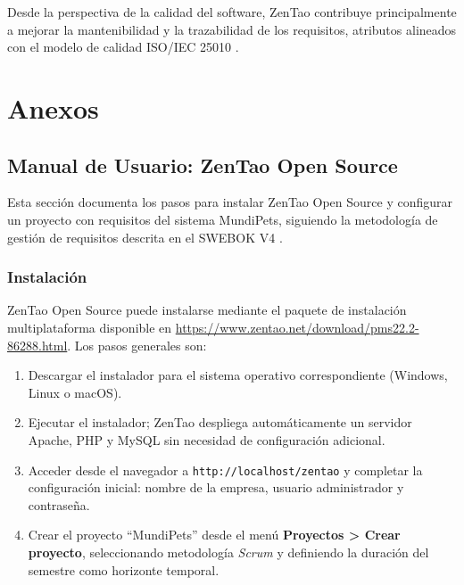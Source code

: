 \documentclass[journal,onecolumn]{IEEEtran}
\begin{document}
Desde la perspectiva de la calidad del software, ZenTao contribuye principalmente a mejorar la
mantenibilidad y la trazabilidad de los requisitos, atributos alineados con el modelo de calidad
ISO/IEC 25010 \cite{iso25010}.

\newpage
\printbibliography[heading=bibnumbered, title={Referencias}]

\newpage


\section{Anexos}

\subsection{Manual de Usuario: ZenTao Open Source}
\label{app:manual}

Esta sección documenta los pasos para instalar ZenTao Open Source y configurar un proyecto
con requisitos del sistema MundiPets, siguiendo la metodología de gestión de requisitos
descrita en el SWEBOK V4 \cite{swebok2024}.

\subsubsection{Instalación}

ZenTao Open Source puede instalarse mediante el paquete de instalación multiplataforma
disponible en \url{https://www.zentao.net/download/pms22.2-86288.html}. Los pasos generales son:

\begin{enumerate}
	\item Descargar el instalador para el sistema operativo correspondiente (Windows, Linux o macOS).
	\item Ejecutar el instalador; ZenTao despliega automáticamente un servidor
	Apache, PHP y MySQL sin necesidad de configuración adicional.
	\item Acceder desde el navegador a \texttt{http://localhost/zentao} y completar la configuración
	inicial: nombre de la empresa, usuario administrador y contraseña.
	\item Crear el proyecto ``MundiPets'' desde el menú \textbf{Proyectos > Crear proyecto},
	seleccionando metodología \textit{Scrum} y definiendo la duración del semestre como horizonte
	temporal.
\end{enumerate}
\end{document}
